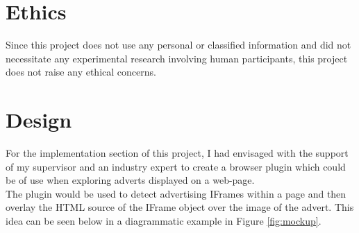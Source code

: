 \documentclass[12pt]{article}
\begin{document}
\section{Ethics}
Since this project does not use any personal or classified information and did not necessitate any experimental research involving human participants, this project does not raise any ethical concerns. 

\section{Design}
For the implementation section of this project, I had envisaged with the support of my supervisor and an industry expert to create a browser plugin which could be of use when exploring adverts displayed on a web-page.  \\

The plugin would be used to detect advertising IFrames within a page and then overlay the HTML source of the IFrame object over the image of the advert. This idea can be seen below in a diagrammatic example in Figure \ref{fig:mockup}. 
\end{document}
